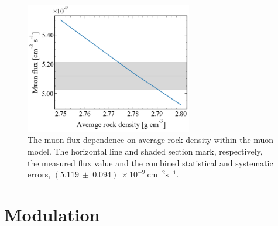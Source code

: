 \begin{figure}[htbp]
    \centering
    \includegraphics[width=0.65\textwidth]{figures/Muons/Flux_density_ws22_ws24.pdf}
    \caption{The muon flux dependence on average rock density within the muon model. The horizontal line and shaded section mark, respectively, the measured flux value and the combined statistical and systematic errors, $(5.119~\pm~0.094)~\times10^{-9}~\textrm{cm}^{-2}\textrm{s}^{-1}$.}
    \label{fig:flux_density}
\end{figure}


\section{Modulation}